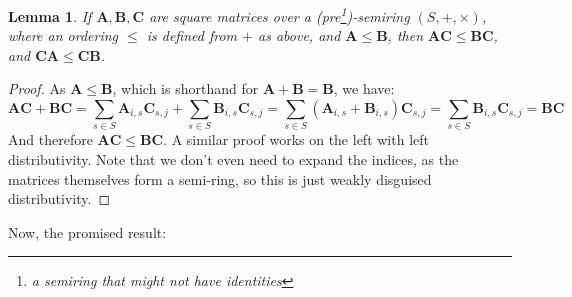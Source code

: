 \documentclass{article}
\theoremstyle{plain}
\newtheorem{lemma}[theorem]{Lemma}
\theoremstyle{definition}
\theoremstyle{remark}
\newcommand\mat[1]{\mathbf #1}
\begin{document}
	\begin{lemma}
		If $\mat A,\mat B,\mat C$ are square matrices over a (pre\footnote{a semiring that might not have identities})-semiring $(S, +, \times)$, where an ordering $\leq$ is defined from $+$ as above, and $\mat A \leq \mat B$, then $\mat A \mat C \leq \mat B \mat C$, and $\mat C \mat A \leq \mat C \mat B$.
	\end{lemma}
	\begin{proof}
		As $\mat A \leq \mat B$, which is shorthand for $\mat A + \mat B = \mat B$, we have:
		\begin{equation*}
			\mat A \mat C + \mat B \mat C = 
			\sum_{s \in S} \mat A_{i,s} \mat C_{s,j} + \sum_{s \in S} \mat B_{i,s} \mat C_{s,j}  = 
			\sum_{s \in S} (\mat A_{i,s} + \mat B_{i,s}) \mat C_{s,j} 
				= \sum_{s \in S} \mat B_{i,s} \mat C_{s,j} 
				= \mat B \mat C 
		\end{equation*}
		And therefore $\mat A \mat C \leq \mat B \mat C$. A similar proof works on the left with left distributivity. Note that we don't even need to expand the indices, as the matrices themselves form a semi-ring, so this is just weakly disguised distributivity.
	\end{proof}
	
	Now, the promised result:
	
\end{document}
